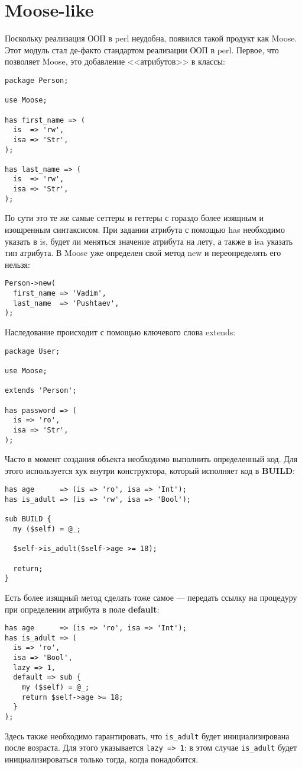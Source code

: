 \section{Moose-like} %
Поскольку реализация ООП в perl неудобна, появился такой продукт как Moose. Этот модуль стал де-факто стандартом реализации ООП в perl. Первое, что позволяет Moose, это добавление <<атрибутов>> в классы:
\begin{verbatim}
package Person;

use Moose;

has first_name => (
  is  => 'rw',
  isa => 'Str',
);

has last_name => (
  is  => 'rw',
  isa => 'Str',
);
\end{verbatim}
По сути это те же самые сеттеры и геттеры с гораздо более изящным и изощренным синтаксисом. При задании атрибута с помощью has необходимо указать в is, будет ли меняться значение атрибута на лету, а также в isa указать тип атрибута. В Moose уже определен свой метод new и переопределять его нельзя:
\begin{verbatim}
Person->new(
  first_name => 'Vadim',
  last_name  => 'Pushtaev',
);
\end{verbatim}
Наследование происходит с помощью ключевого слова extends:
\begin{verbatim}
package User;

use Moose;

extends 'Person';

has password => (
  is => 'ro',
  isa => 'Str',
);
\end{verbatim}
Часто в момент создания объекта необходимо выполнить определенный код. Для этого используется хук внутри конструктора, который исполняет код в \textbf{BUILD}:
\begin{verbatim}
has age      => (is => 'ro', isa => 'Int');
has is_adult => (is => 'rw', isa => 'Bool');

sub BUILD {
  my ($self) = @_;

  $self->is_adult($self->age >= 18);

  return;
}
\end{verbatim}
Есть более изящный метод сделать тоже самое --- передать ссылку на процедуру при определении атрибута в поле \textbf{default}:
\begin{verbatim}
has age      => (is => 'ro', isa => 'Int');
has is_adult => (
  is => 'ro',
  isa => 'Bool',
  lazy => 1,
  default => sub {
    my ($self) = @_;
    return $self->age >= 18;
  }
);
\end{verbatim}
Здесь также необходимо гарантировать, что \verb|is_adult| будет инициализирована после возраста. Для этого указывается \verb|lazy => 1|: в этом случае \verb|is_adult| будет инициализироваться только тогда, когда понадобится.

